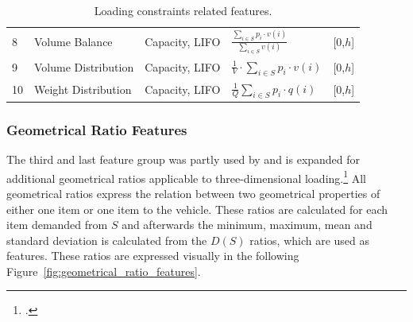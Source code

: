 \begin{table}[!h]
\begin{tabular}{@{}P{0.08\textwidth}P{0.16\textwidth}P{0.26\textwidth}P{0.28\textwidth}@{}P{0.1\textwidth}@{}}
        8  & Volume Balance                                                                                  & Capacity, \gls{LIFO}   & $\frac{\displaystyle\sum\nolimits_{i \in S}p_i \cdot v(i)}{\displaystyle\sum\nolimits_{i \in S}v(i)}$ & [0,$h$] \\
        9  & Volume Distribution                                                                             & Capacity, \gls{LIFO}   & $\displaystyle\frac{1}{V}\cdot\sum_{i \in S}p_i \cdot v(i)$                                           & [0,$h$] \\
        10 & Weight Distribution                                                                             & Capacity, \gls{LIFO}   & $\displaystyle\frac{1}{Q}\sum_{i \in S}p_i \cdot q(i)$                                                & [0,$h$] \\
        \bottomrule
    \end{tabular}
    \caption{Loading constraints related features.}
    \label{tab:loading_constraints_features}
\end{table}


\subsubsection{Geometrical Ratio Features}
The third and last feature group
was partly used by \cite{zhang_learning-based_2022} and is expanded for additional geometrical ratios applicable to three-dimensional loading.\footcite[cf.][p. 14]{zhang_learning-based_2022}
All geometrical ratios express the relation between two geometrical properties of either one item or one item to the vehicle. These ratios
are calculated for each item demanded from $S$ and afterwards the minimum, maximum, mean and standard deviation is calculated
from the $D(S)$ ratios, which are used as features. These ratios are expressed visually in the following Figure~\ref{fig:geometrical_ratio_features}.



